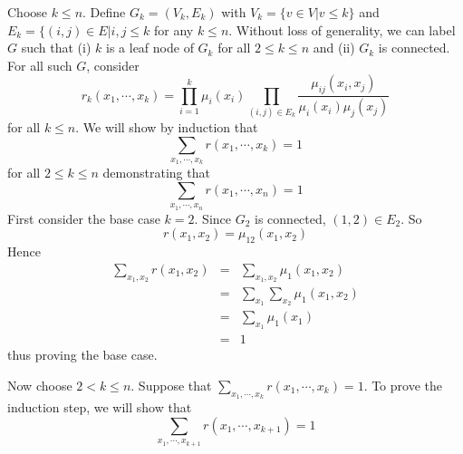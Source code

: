 \documentclass{article}
\begin{document}
\begin{enumerate}
	Choose $k \leq n$. 
	Define $G_k = (V_k, E_k)$ with $V_k = \{v \in V | v \leq k\}$ and $E_k = \{(i, j) \in E | i,j \leq k$ for any $k \leq n$. Without loss of generality, we can label $G$ such that (i) $k$ is a leaf node of $G_k$ for all $2 \leq k \leq n$ and (ii) $G_k$ is connected. For all such $G$, consider
	\begin{equation}
		r_k(x_1,\cdots,x_k) = \prod_{i = 1}^k \mu_i(x_i) \prod_{(i, j) \in E_k} \frac{\mu_{ij}(x_i, x_j)}{\mu_i(x_i)\mu_j(x_j)}
	\end{equation} 
	for all $k \leq n$. We will show by induction that 
	\begin{equation}
		\sum_{x_1,\cdots,x_k} r(x_1,\cdots,x_k) = 1
	\end{equation}
	for all $2 \leq k \leq n$ demonstrating that
	\begin{equation}
		\sum_{x_1,\cdots,x_n} r(x_1,\cdots,x_n) = 1
	\end{equation}
	First consider the base case $k = 2$. Since $G_2$ is connected, $(1, 2) \in E_2$. So
	\begin{equation}
		r(x_1, x_2) = \mu_{12}(x_1, x_2)
	\end{equation}
	Hence
	\begin{equation}
		\begin{aligned}
		\sum_{x_1,x_2} r(x_1, x_2) &= & \sum_{x_1,x_2} \mu_1(x_1, x_2) \\
		& = & \sum_{x_1} \sum_{x_2} \mu_1(x_1, x_2) \\
		& = & \sum_{x_1} \mu_1(x_1) \\
		& = & 1
		\end{aligned}
	\end{equation}
	thus proving the base case.

	Now choose $2 < k \leq n$. Suppose that $\sum_{x_1,\cdots,x_k} r(x_1,\cdots,x_k) = 1$. To prove the induction step, we will show that
	\begin{equation}
		\sum_{x_1,\cdots,x_{k + 1}} r(x_1,\cdots,x_{k + 1}) = 1
	\end{equation}


\end{enumerate}
\end{document}
